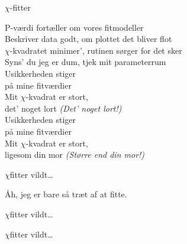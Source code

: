 \begin{song}{$\chi$-fitter}
  \begin{SBVerse}
    P-værdi fortæller om vores fitmodeller\\
    Beskriver data godt, om plottet det bliver flot\\
    $\chi$-kvadratet minimer', rutinen sørger for det sker\\
    Syns' du jeg er dum, tjek mit parameterrum\\\medskip
    Usikkerheden stiger\\
    på mine fitværdier\\
    Mit $\chi$-kvadrat er stort,\\
    det' noget lort \emph{(Det' noget lort!)}\\\medskip
    Usikkerheden stiger\\
    på mine fitværdier\\
    Mit $\chi$-kvadrat er stort,\\
    ligesom din mor \emph{(Større end din mor!)}
  \end{SBVerse}

  \begin{SBChorus}
    $\chi$fitter vildt\ldots
  \end{SBChorus}

  \begin{SBSection*}
    Åh, jeg er bare så træt af at fitte.
  \end{SBSection*}

  \begin{SBChorus}
    $\chi$fitter vildt\ldots
  \end{SBChorus}

  \begin{SBChorus}
    $\chi$fitter vildt\ldots
  \end{SBChorus}
\end{song}